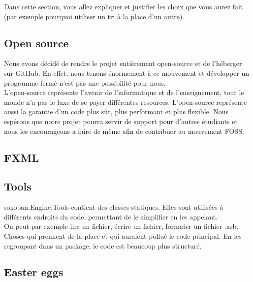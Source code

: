 \documentclass[../main.tex]{subfiles}
\begin{document}
Dans cette section, vous allez expliquer et justifier les choix que vous aurez fait (par exemple pourquoi utiliser un tri à la place d'un autre).

\subsection{Open source}
Nous avons décidé de rendre le projet entièrement open-source et de l'héberger sur GitHub. 
En effet, nous tenons énormement à ce mouvement et développer un programme fermé n'est pas une possibilité pour nous. \\

L'open-source représente l'avenir de l'informatique et de l'enseignement, tout le monde n'a pas le luxe de se payer différentes resources.
L'open-source représente aussi la garantie d'un code plus sûr, plus performant et plus flexible.
Nous espérons que notre projet pourra servir de support pour d'autres étudiants et nous les encourageons a faire de même 
afin de contribuer au mouvement FOSS.

\subsection{FXML}

\subsection{Tools}
sokoban.Engine.Tools contient des classes statiques. Elles sont utilisées à différents endroits du code, permettant de le simplifier en les appelant. \\

On peut par exemple lire un fichier, écrire un fichier, formater un fichier .xsb. Choses qui prennent de la place et qui auraient pollué le code principal. En les regroupant dans un package, le code est beaucoup plus structuré.

\subsection{Easter eggs}
\end{document}
